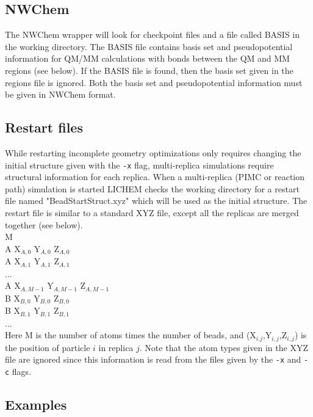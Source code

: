 \documentclass[12pt]{report}
\begin{document}
\subsection{NWChem}

The NWChem wrapper will look for checkpoint files and a file called BASIS in
the working directory.
The BASIS file contains basis set and pseudopotential information for QM/MM
calculations with bonds between the QM and MM regions (see below).
If the BASIS file is found, then the basis set given in the regions file is
ignored.
Both the basis set and pseudopotential information must be given in NWChem
format.

\subsection{Restart files}

While restarting incomplete geometry optimizations only requires changing
the initial structure given with the \texttt{-x} flag, multi-replica simulations
require structural information for each replica.
When a multi-replica (PIMC or reaction path) simulation is started LICHEM
checks the working directory for a restart file named "BeadStartStruct.xyz"
which will be used as the initial structure.
The restart file is similar to a standard XYZ file, except all the replicas
are merged together (see below). \\

M \\

A  X$_{A,0}$  Y$_{A,0}$  Z$_{A,0}$ \\
A  X$_{A,1}$  Y$_{A,1}$  Z$_{A,1}$ \\
... \\
A  X$_{A,M-1}$  Y$_{A,M-1}$  Z$_{A,M-1}$ \\
B  X$_{B,0}$  Y$_{B,0}$  Z$_{B,0}$ \\
B  X$_{B,1}$  Y$_{B,1}$  Z$_{B,1}$ \\
... \\

Here M is the number of atoms times the number of beads, and
(X$_{i.j}$,Y$_{i,j}$,Z$_{i,j}$) is the position of particle $i$ in replica
$j$.
Note that the atom types given in the XYZ file are ignored since this
information is read from the files given by the \texttt{-x} and \texttt{-c}
flags.

\subsection{Examples}
\end{document}
